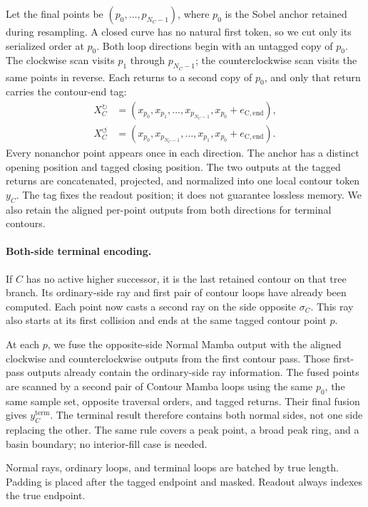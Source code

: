 Let the final points be $(p_0,\ldots,p_{N_C-1})$, where $p_0$ is the Sobel anchor retained during resampling. A closed curve has no natural first token, so we cut only its serialized order at $p_0$. Both loop directions begin with an untagged copy of $p_0$. The clockwise scan visits $p_1$ through $p_{N_C-1}$; the counterclockwise scan visits the same points in reverse. Each returns to a second copy of $p_0$, and only that return carries the contour-end tag:
\begin{align}
X_C^{\circlearrowright}&=(x_{p_0},x_{p_1},\ldots,x_{p_{N_C-1}},x_{p_0}+e_{\mathrm{C,end}}),\\
X_C^{\circlearrowleft}&=(x_{p_0},x_{p_{N_C-1}},\ldots,x_{p_1},x_{p_0}+e_{\mathrm{C,end}}).
\end{align}
Every nonanchor point appears once in each direction. The anchor has a distinct opening position and tagged closing position. The two outputs at the tagged returns are concatenated, projected, and normalized into one local contour token $y_C$. The tag fixes the readout position; it does not guarantee lossless memory. We also retain the aligned per-point outputs from both directions for terminal contours.

\paragraph{Both-side terminal encoding.}
If $C$ has no active higher successor, it is the last retained contour on that tree branch. Its ordinary-side ray and first pair of contour loops have already been computed. Each point now casts a second ray on the side opposite $\sigma_C$. This ray also starts at its first collision and ends at the same tagged contour point $p$.

At each $p$, we fuse the opposite-side Normal Mamba output with the aligned clockwise and counterclockwise outputs from the first contour pass. Those first-pass outputs already contain the ordinary-side ray information. The fused points are scanned by a second pair of Contour Mamba loops using the same $p_0$, the same sample set, opposite traversal orders, and tagged returns. Their final fusion gives $y_C^{\mathrm{term}}$. The terminal result therefore contains both normal sides, not one side replacing the other. The same rule covers a peak point, a broad peak ring, and a basin boundary; no interior-fill case is needed.

Normal rays, ordinary loops, and terminal loops are batched by true length. Padding is placed after the tagged endpoint and masked. Readout always indexes the true endpoint.

